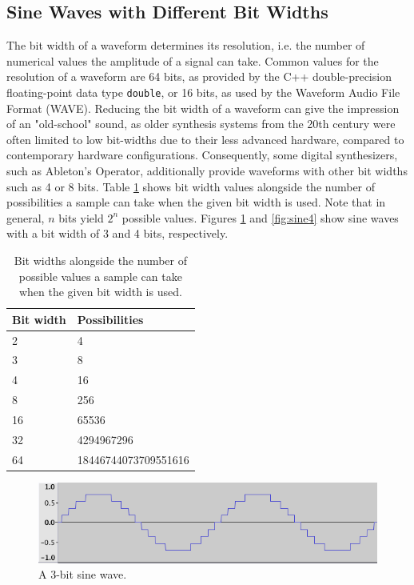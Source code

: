 \documentclass[12pt,twoside]{report}
\begin{document}

\subsection{Sine Waves with Different Bit Widths}

The bit width of a waveform determines its resolution, i.e. the number of numerical values the amplitude of a signal can take. Common values for the resolution of a waveform are 64 bits, as provided by the C++ double-precision floating-point data type \texttt{double}, or 16 bits, as used by the Waveform Audio File Format (WAVE). Reducing the bit width of a waveform can give the impression of an "old-school" sound, as older synthesis systems from the 20th century were often limited to low bit-widths due to their less advanced hardware, compared to contemporary hardware configurations. Consequently, some digital synthesizers, such as Ableton's Operator, additionally provide waveforms with other bit widths such as 4 or 8 bits. Table \ref{tb:bitw} shows bit width values alongside the number of possibilities a sample can take when the given bit width is used. Note that in general, $n$ bits yield $2^n$ possible values. Figures \ref{fig:sine3} and \ref{fig:sine4} show sine waves with a bit width of 3 and 4 bits, respectively.

\begin{table}[th!]

  \centering

  \begin{tabular}[]{| l | l |}
    \hline
    \rowcolor[gray]{0.8}
    Bit width & Possibilities\\\hline
    2 & 4\\\hline
    3 & 8\\\hline
    4 & 16\\\hline
    8 & 256\\\hline
    16 & 65536\\\hline
    32 & 4294967296\\\hline
    64 & 18446744073709551616\\
    \hline
  \end{tabular}

  \caption{Bit widths alongside the number of possible values a sample can take when the given bit width is used.}

  \label{tb:bitw}

\end{table}

\begin{figure}[th!]
  \includegraphics[scale=0.5]{img/sine3}
  \caption{A 3-bit sine wave.}
  \label{fig:sine3}
\end{figure}
\end{document}
